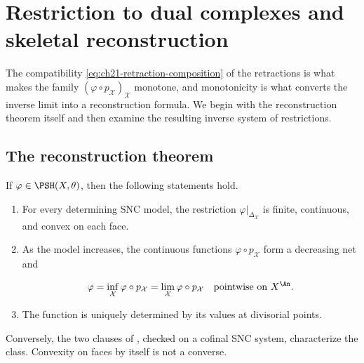 \section{Restriction to dual complexes and skeletal reconstruction}
\label{sec:ch21-restriction}

The compatibility \eqref{eq:ch21-retraction-composition} of the retractions
is what makes the family \((\varphi\circ p_{\mathcal X})_{\mathcal X}\)
monotone, and monotonicity is what converts the inverse limit
 into a reconstruction formula.  We begin
with the reconstruction theorem itself and then examine the resulting
inverse system of restrictions.

\subsection{The reconstruction theorem}
\label{sec:ch21-reconstruction}

\begin{theorem}\label{thm:bfj-skeletal-characterization}
If \(\varphi\in\PSH(X,\theta)\), then the following statements hold.

\begin{enumerate}
\item For every determining SNC model, the restriction
\(\varphi|_{\Delta_{\mathcal X}}\) is finite, continuous, and convex on
each face.
\item As the model increases, the continuous functions
\(\varphi\circ p_{\mathcal X}\) form a decreasing net and

\begin{equation}
\label{eq:ch21-skeletal-reconstruction}
              \varphi
              =\inf_{\mathcal X}\varphi\circ p_{\mathcal X}
              =\lim_{\mathcal X}\varphi\circ p_{\mathcal X}
              \quad\text{pointwise on }X^{\An}.
\end{equation}

\item The function is uniquely determined by its values at divisorial
points.
\end{enumerate}

Conversely, the two clauses of , checked on a
cofinal SNC system, characterize the class.  Convexity on faces by itself is
not a converse.
\end{theorem}

